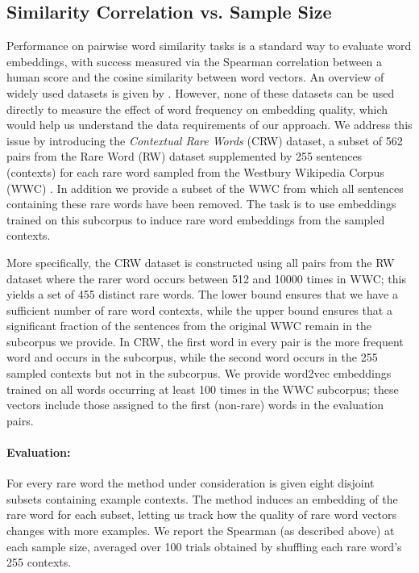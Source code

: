\documentclass[11pt,a4paper]{article}
\begin{document}
\subsection{Similarity Correlation vs. Sample Size}\label{subsec:wordsim}

Performance on pairwise word similarity tasks is a standard way to evaluate word embeddings, with success measured via the Spearman correlation between a human score and the cosine similarity between word vectors.
An overview of widely used datasets is given by \citet{Faruqui:14}.
However, none of these datasets can be used directly to measure the effect of word frequency on embedding quality, which would help us understand the data requirements of our approach.
We address this issue by introducing the {\em Contextual Rare Words} (CRW) dataset, a subset of 562 pairs from the Rare Word (RW) dataset \cite{Luong:13} supplemented by 255 sentences (contexts) for each rare word sampled from the Westbury Wikipedia Corpus (WWC) \cite{Shaoul:10}.
In addition we provide a subset of the WWC from which all sentences containing these rare words have been removed.
The task is to use embeddings trained on this subcorpus to induce rare word embeddings from the sampled contexts.

More specifically, the CRW dataset is constructed using all pairs from the RW dataset where the rarer word occurs between 512 and 10000 times in WWC; this yields a set of 455 distinct rare words.
The lower bound ensures that we have a sufficient number of rare word contexts, while the upper bound ensures that a significant fraction of the sentences from the original WWC remain in the subcorpus we provide.
In CRW, the first word in every pair is the more frequent word and occurs in the subcorpus, while the second word occurs in the 255 sampled contexts but not in the subcorpus.
We provide word2vec embeddings trained on all words occurring at least 100 times in the WWC subcorpus;
these vectors include those assigned to the first (non-rare) words in the evaluation pairs.

\paragraph{Evaluation:}
For every rare word the method under consideration is given eight disjoint subsets containing  example contexts.
The method induces an embedding of the rare word for each subset, letting us track how the quality of rare word vectors changes with more examples.
We report the Spearman  (as described above) at each sample size, averaged over 100 trials obtained by shuffling each rare word's 255 contexts.
\end{document}
